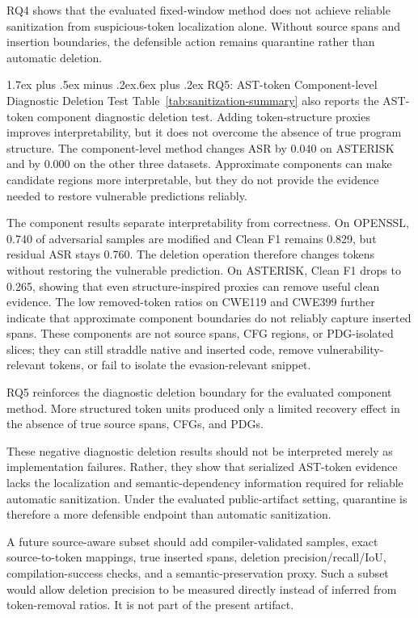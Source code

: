 \documentclass[letterpaper,twocolumn,10pt,twoside]{article}
\makeatletter
\renewcommand\subsection{\@startsection{subsection}{2}{\z@}%
  {1.7ex plus .5ex minus .2ex}{.6ex plus .2ex}%
  {\normalfont\normalsize\bfseries}}
\newcommand{\cleanf}{Clean F1}
\newcommand{\asrshort}{ASR}
\newcommand{\dataset}[1]{\textsc{#1}}
\makeatother
\begin{document}
RQ4 shows that the evaluated fixed-window method does not achieve reliable sanitization from suspicious-token localization alone. Without source spans and insertion boundaries, the defensible action remains quarantine rather than automatic deletion.

\subsection{RQ5: AST-token Component-level Diagnostic Deletion Test}
Table~\ref{tab:sanitization-summary} also reports the AST-token component diagnostic deletion test. Adding token-structure proxies improves interpretability, but it does not overcome the absence of true program structure. The component-level method changes \asrshort{} by 0.040 on \dataset{ASTERISK} and by 0.000 on the other three datasets. Approximate components can make candidate regions more interpretable, but they do not provide the evidence needed to restore vulnerable predictions reliably.

The component results separate interpretability from correctness. On \dataset{OPENSSL}, 0.740 of adversarial samples are modified and \cleanf{} remains 0.829, but residual \asrshort{} stays 0.760. The deletion operation therefore changes tokens without restoring the vulnerable prediction. On \dataset{ASTERISK}, \cleanf{} drops to 0.265, showing that even structure-inspired proxies can remove useful clean evidence. The low removed-token ratios on \dataset{CWE119} and \dataset{CWE399} further indicate that approximate component boundaries do not reliably capture inserted spans. These components are not source spans, CFG regions, or PDG-isolated slices; they can still straddle native and inserted code, remove vulnerability-relevant tokens, or fail to isolate the evasion-relevant snippet.

RQ5 reinforces the diagnostic deletion boundary for the evaluated component method. More structured token units produced only a limited recovery effect in the absence of true source spans, CFGs, and PDGs.

These negative diagnostic deletion results should not be interpreted merely as implementation failures. Rather, they show that serialized AST-token evidence lacks the localization and semantic-dependency information required for reliable automatic sanitization. Under the evaluated public-artifact setting, quarantine is therefore a more defensible endpoint than automatic sanitization.

A future source-aware subset should add compiler-validated samples, exact source-to-token mappings, true inserted spans, deletion precision/recall/IoU, compilation-success checks, and a semantic-preservation proxy. Such a subset would allow deletion precision to be measured directly instead of inferred from token-removal ratios. It is not part of the present artifact.
\end{document}
